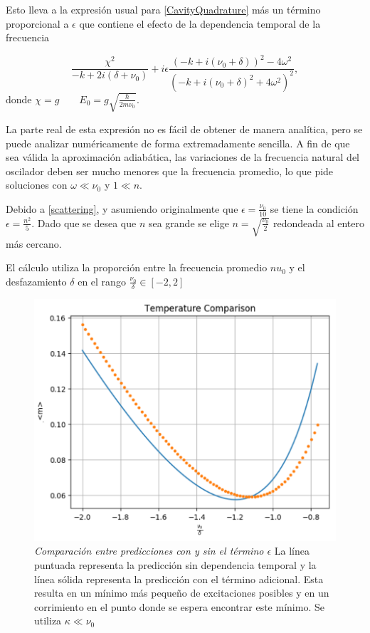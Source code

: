 \documentclass[10pt,a4paper]{report}
\begin{document}
Esto lleva a la expresión usual para \ref{CavityQuadrature} más un término proporcional a $\epsilon$ que contiene el efecto de la dependencia temporal de la frecuencia

\begin{equation}
 \frac{\chi^2}{-k + 2i(\delta + \nu_0)} +i\epsilon\frac{(-k + i(\nu_0 + \delta))^2 - 4\omega^2}{(-k + i(\nu_0 + \delta)^2 + 4\omega^2)^2},
\end{equation} donde $\chi = g \qquad E_0 = g \sqrt{\frac{\hbar}{2m\nu_0}}$.

La parte real de esta expresión no es fácil de obtener de manera analítica, pero se puede analizar numéricamente de forma extremadamente sencilla. A fin de que sea válida la aproximación adiabática, las variaciones de la frecuencia natural del oscilador deben ser mucho menores que la frecuencia promedio, lo que pide soluciones con  $\omega \ll \nu_0$ y $1 \ll n$.

Debido a \ref{scattering}, y asumiendo originalmente que $\epsilon = \frac{\nu_0}{10}$ se tiene la condición $\epsilon = \frac{n^2}{5}$. Dado que se desea que $n$ sea grande se elige $n=\sqrt{\frac{\nu_0}{2}}$ redondeada al entero más cercano.

El cálculo utiliza la proporción entre la frecuencia promedio $nu_0$ y el desfazamiento $\delta$ en el rango $\frac{\nu_0}{\delta} \in [-2,2]$

\begin{figure}
\includegraphics[scale=.55]{GraficaTemp.pdf} 
\caption{\textit{Comparación entre predicciones con y sin el término $\epsilon$} La línea puntuada representa la predicción sin dependencia temporal y la línea sólida representa la predicción con el término adicional. Esta resulta en un mínimo más pequeño de excitaciones posibles y en un corrimiento en el punto donde se espera encontrar este mínimo. Se utiliza $\kappa \ll \nu_0$}
\end{figure}
\end{document}
